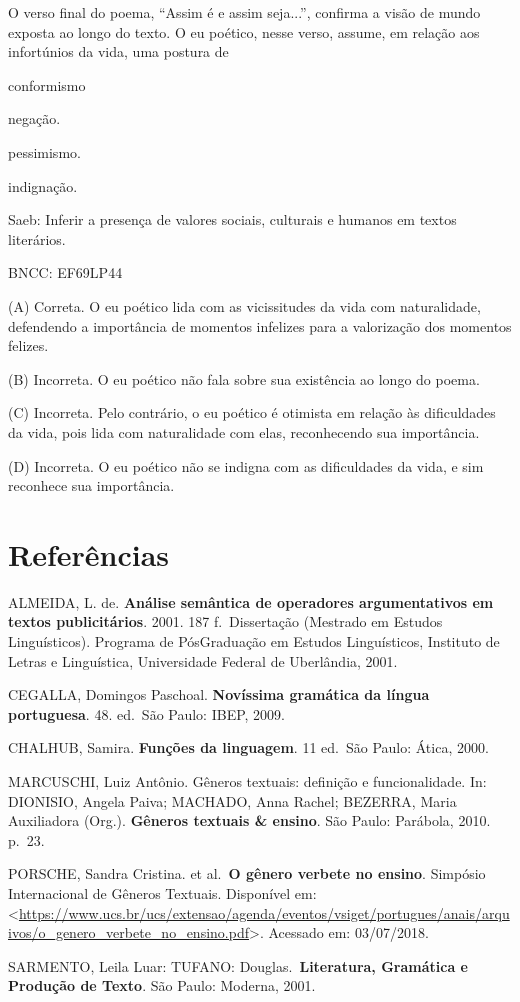 
O verso final do poema, ``Assim é e assim seja...'', confirma a visão de
mundo exposta ao longo do texto. O eu poético, nesse verso, assume, em
relação aos infortúnios da vida, uma postura de

\begin{escolha}
\item conformismo

\item negação.

\item pessimismo.

\item indignação.
\end{escolha}

Saeb: Inferir a presença de valores sociais, culturais e humanos em
textos literários.

BNCC: EF69LP44

(A) Correta. O eu poético lida com as vicissitudes da vida com
naturalidade, defendendo a importância de momentos infelizes para a
valorização dos momentos felizes.

(B) Incorreta. O eu poético não fala sobre sua existência ao longo do
poema.

(C) Incorreta. Pelo contrário, o eu poético é otimista em relação às
dificuldades da vida, pois lida com naturalidade com elas, reconhecendo
sua importância.

(D) Incorreta. O eu poético não se indigna com as dificuldades da vida,
e sim reconhece sua importância.

\section{Referências}

ALMEIDA, L. de. \textbf{Análise semântica de operadores argumentativos
em textos publicitários}. 2001. 187 f.~Dissertação (Mestrado em Estudos
Linguísticos). Programa de PósGraduação em Estudos Linguísticos,
Instituto de Letras e Linguística, Universidade Federal de Uberlândia,
2001.

CEGALLA, Domingos Paschoal. \textbf{Novíssima gramática da língua
portuguesa}. 48. ed.~São Paulo: IBEP, 2009.

CHALHUB, Samira. \textbf{Funções da linguagem}. 11 ed.~São Paulo: Ática,
2000.

MARCUSCHI, Luiz Antônio. Gêneros textuais: definição e funcionalidade.
In: DIONISIO, Angela Paiva; MACHADO, Anna Rachel; BEZERRA, Maria
Auxiliadora (Org.). \textbf{Gêneros textuais \& ensino}. São Paulo:
Parábola, 2010. p.~23.

PORSCHE, Sandra Cristina. et al.~\textbf{O gênero verbete no ensino}.
Simpósio Internacional de Gêneros Textuais. Disponível em:
\textless{}\url{https://www.ucs.br/ucs/extensao/agenda/eventos/vsiget/portugues/anais/arquivos/o_genero_verbete_no_ensino.pdf}\textgreater.
Acessado em: 03/07/2018.

SARMENTO, Leila Luar: TUFANO: Douglas.~\textbf{Literatura, Gramática e
Produção de Texto}. São Paulo: Moderna, 2001.
